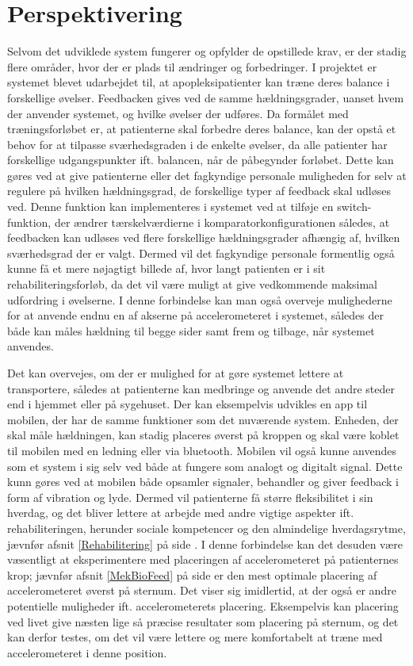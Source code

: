 \section{Perspektivering}
Selvom det udviklede system fungerer og opfylder de opstillede krav, er der stadig flere områder, hvor der er plads til ændringer og forbedringer. 
I projektet er systemet blevet udarbejdet til, at apopleksipatienter kan træne deres balance i forskellige øvelser. Feedbacken gives ved de samme hældningsgrader, uanset hvem der anvender systemet, og hvilke øvelser der udføres. Da formålet med træningsforløbet er, at patienterne skal forbedre deres balance, kan der opstå et behov for at tilpasse sværhedsgraden i de enkelte øvelser, da alle patienter har forskellige udgangspunkter ift. balancen, når de påbegynder forløbet. Dette kan gøres ved at give patienterne eller det fagkyndige personale muligheden for selv at regulere på hvilken hældningsgrad, de forskellige typer af feedback skal udløses ved. Denne funktion kan implementeres i systemet ved at tilføje en switch-funktion, der ændrer tærskelværdierne i komparatorkonfigurationen således, at feedbacken kan udløses ved flere forskellige hældningsgrader afhængig af, hvilken sværhedsgrad der er valgt. Dermed vil det fagkyndige personale formentlig også kunne få et mere nøjagtigt billede af, hvor langt patienten er i sit rehabiliteringsforløb, da det vil være muligt at give vedkommende maksimal udfordring i øvelserne. I denne forbindelse kan man også overveje mulighederne for at anvende endnu en af akserne på accelerometeret i systemet, således der både kan måles hældning til begge sider samt frem og tilbage, når systemet anvendes.

Det kan overvejes, om der er mulighed for at gøre systemet lettere at transportere, således at patienterne kan medbringe og anvende det andre steder end i hjemmet eller på sygehuset. Der kan eksempelvis udvikles en app til mobilen, der har de samme funktioner som det nuværende system. Enheden, der skal måle hældningen, kan stadig placeres øverst på kroppen og skal være koblet til mobilen med en ledning eller via bluetooth. Mobilen vil også kunne anvendes som et system i sig selv ved både at fungere som analogt og digitalt signal. Dette kunn gøres ved at mobilen både opsamler signaler, behandler og giver feedback i form af vibration og lyde. Dermed vil patienterne få større fleksibilitet i sin hverdag, og det bliver lettere at arbejde med andre vigtige aspekter ift. rehabiliteringen, herunder sociale kompetencer og den almindelige hverdagsrytme, jævnfør afsnit \ref{Rehabilitering} på side \pageref{Rehabilitering}. I denne forbindelse kan det desuden være væsentligt at eksperimentere med placeringen af accelerometeret på patienternes krop; jævnfør afsnit \ref{MekBioFeed} på side \pageref{MekBioFeed} er den mest optimale placering af accelerometeret øverst på sternum. Det viser sig imidlertid, at der også er andre potentielle muligheder ift. accelerometerets placering. Eksempelvis kan placering ved livet give næsten lige så præcise resultater som placering på sternum, og det kan derfor testes, om det vil være lettere og mere komfortabelt at træne med accelerometeret i denne position\cite{Gjoreski2011}.

